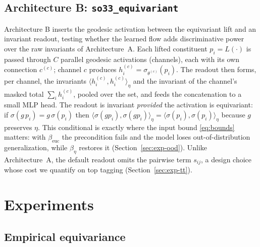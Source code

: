 \documentclass[11pt]{article}
\begin{document}
\subsection{Architecture B: \texttt{so33\_equivariant}}
\label{sec:method-equiv}

Architecture B inserts the geodesic activation between the equivariant
lift and an invariant readout, testing whether the learned flow adds
discriminative power over the raw invariants of Architecture~A. Each
lifted constituent $p_i = L(\cdot)$ is passed through $C$ parallel
geodesic activations (channels), each with its own connection
$c^{(c)}$; channel $c$ produces $h_i^{(c)} = \sigma_{\theta^{(c)}}(p_i)$.
The readout then forms, per channel, the invariants
$\langle h_i^{(c)}, h_i^{(c)}\rangle_\eta$ and the invariant of the
channel's masked total $\sum_i h_i^{(c)}$, pooled over the set, and feeds
the concatenation to a small MLP head. The readout is invariant
\emph{provided} the activation is equivariant: if
$\sigma(g\,p_i) = g\,\sigma(p_i)$ then
$\langle \sigma(g p_i), \sigma(g p_i)\rangle_\eta
 = \langle \sigma(p_i), \sigma(p_i)\rangle_\eta$ because $g$ preserves
$\eta$. This conditional is exactly where the input bound
\eqref{eq:bounds} matters: with $\beta_{\text{euc}}$ the precondition
fails and the model loses out-of-distribution generalization, while
$\beta_\eta$ restores it (Section~\ref{sec:exp-ood}). Unlike
Architecture~A, the default readout omits the pairwise term $s_{ij}$,
a design choice whose cost we quantify on top tagging
(Section~\ref{sec:exp-tt}).

\section{Experiments}
\label{sec:experiments}

\subsection{Empirical equivariance}
\label{sec:exp-equiv}
\end{document}
